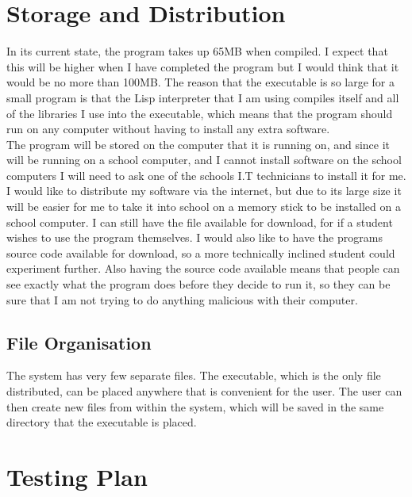 \section{Storage and Distribution}

In its current state, the program takes up 65MB when compiled. I expect that
this will be higher when I have completed the program but I would think that it
would be no more than 100MB. The reason that the executable is so large for a
small program is that the Lisp interpreter that I am using compiles itself and
all of the libraries I use into the executable, which means that the program
should run on any computer without having to install any extra software. \\

The program will be stored on the computer that it is running on, and since it
will be running on a school computer, and I cannot install software on the
school computers I will need to ask one of the schools I.T technicians to
install it for me. \\

I would like to distribute my software via the internet, but due to its large
size it will be easier for me to take it into school on a memory stick to be
installed on a school computer. I can still have the file available for
download, for if a student wishes to use the program themselves. I would also
like to have the programs source code available for download, so a more
technically inclined student could experiment further. Also having the source
code available means that people can see exactly what the program does before
they decide to run it, so they can be sure that I am not trying to do anything
malicious with their computer. \\

\subsection{File Organisation}

The system has very few separate files. The executable, which is the only file
distributed, can be placed anywhere that is convenient for the user. The user
can then create new files from within the system, which will be saved in the
same directory that the executable is placed. \\


\section{Testing Plan}

